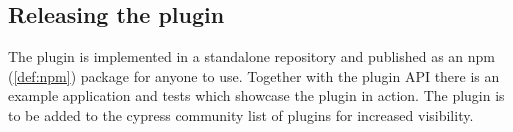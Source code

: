 \subsection{Releasing the plugin}

The plugin is implemented in a standalone repository \cite{cypress-trusted-types:github} and
published as an npm (\ref{def:npm}) package \cite{cypress-trusted-types:npm} for anyone to use.
Together with the plugin API there is an example application and tests which showcase the plugin in
action. The plugin is to be added to the cypress community list of plugins for increased visibility.
